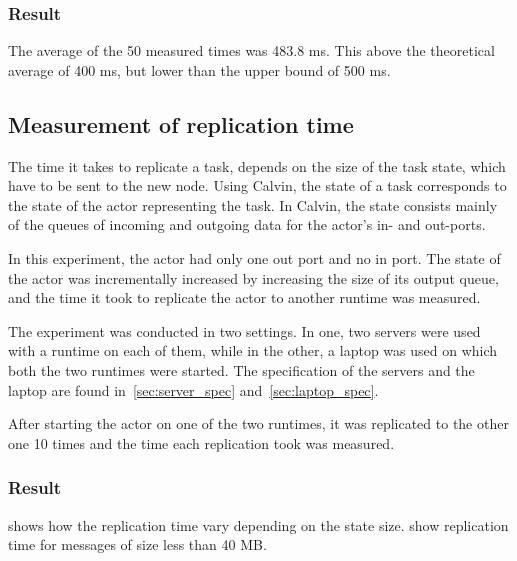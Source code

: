 \documentclass{cslthse-msc}
\begin{document}
\subsubsection*{Result}
The average of the 50 measured times was 483.8 ms. This above the theoretical average of 400 ms, but lower than the upper bound of 500 ms.


\subsection{Measurement of replication time} \label{sec:eval_repl_time}
The time it takes to replicate a task, depends on the size of the task state, which have to be sent to the new node. Using Calvin, the state of a task corresponds to the state of the actor representing the task. In Calvin, the state consists mainly of the queues of incoming and outgoing data for the actor's in- and out-ports.

In this experiment, the actor had only one out port and no in port. The state of the actor was incrementally increased by increasing the size of its output queue, and the time it took to replicate the actor to another runtime was measured.

The experiment was conducted in two settings. In one, two servers were used with a runtime on each of them, while in the other, a laptop was used on which both the two runtimes were started. The specification of the servers and the laptop are found in~\cref{sec:server_spec} and~\cref{sec:laptop_spec}.

After starting the actor on one of the two runtimes, it was replicated to the other one 10 times and the time each replication took was measured. 

\subsubsection*{Result}
 shows how the replication time vary depending on the state size.  show replication time for messages of size less than 40 MB. 
\end{document}
